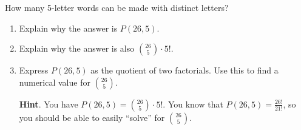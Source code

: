 \documentclass{book}
\begin{document}
\setcounter{cpjt}{92}
\addtocounter{cpjt}{-1}
\begin{activity}\label{activity-85}
\hypertarget{p-666}{}%
How many 5-letter words can be made with distinct letters?%
\begin{enumerate}[font=\bfseries,label=(\alph*),ref=\alph*]
\item\label{task-136} \hypertarget{p-667}{}%
Explain why the answer is \(P(26,5)\).%
\item\label{task-137} \hypertarget{p-668}{}%
Explain why the answer is also \(\binom{26}{5}\cdot 5!\).%
\item\label{task-138} \hypertarget{p-669}{}%
Express \(P(26,5)\) as the quotient of two factorials.  Use this to find a numerical value for \(\binom{26}{5}\).%
\par\smallskip%
\noindent\textbf{Hint}.\hypertarget{hint-47}{}\quad%
\hypertarget{p-670}{}%
You have \(P(26,5) = \binom{26}{5}\cdot 5!\).  You know that \(P(26,5) = \frac{26!}{21!}\), so you should be able to easily ``solve'' for \(\binom{26}{5}\).%
\end{enumerate}
\end{activity}

\clearpage
\end{document}
